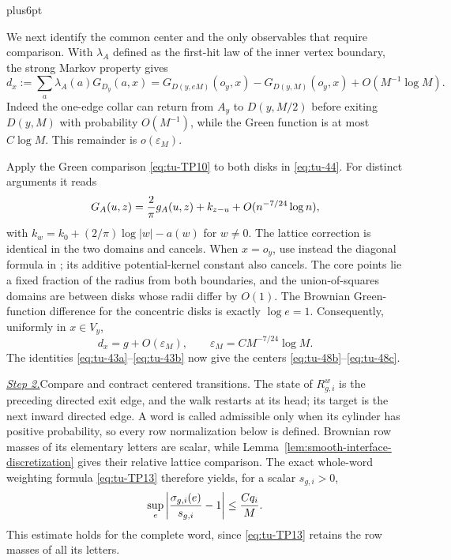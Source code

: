 \documentclass[12pt,reqno]{amsart}
\makeatletter
\theoremstyle{plain}
\theoremstyle{definition}
\theoremstyle{remark}
\renewenvironment{proof}[1][\proofname]{%
  \par
  \pushQED{\qed}%
  \normalfont
  \topsep6pt plus6pt\relax
  \trivlist
  \item[\hskip\labelsep\slshape #1\@addpunct{.}]%
  \ignorespaces
}{%
  \popQED
  \endtrivlist
  \@endpefalse
}
\DeclareRobustCommand{\qed}{%
  \leavevmode\unskip\penalty9999\hbox{}\nobreak
  \ifmmode
    \makebox[0pt][l]{\qquad\hbox{\qedsymbol}}%
  \else
    \qquad\hbox{\qedsymbol}%
  \fi
}
\renewcommand{\qedsymbol}{\rule[.47pt]{4pt}{6pt}}
\numberwithin{equation}{section}
\makeatother
\begin{document}
\begin{proof}[Proof of Lemma~\ref{lem:terminal-feynman-kac}]
We next identify the common center and the only observables that require
comparison.  With \(\lambda_A\) defined as the first-hit law of the
inner vertex boundary, the strong Markov property gives
\begin{equation}
 d_x:=\sum_a\lambda_A(a)G_{D_y}(a,x)
 =G_{D(y,eM)}(o_y,x)-G_{D(y,M)}(o_y,x)
                  +O(M^{-1}\log M).                         \label{eq:tu-44}
\end{equation}
Indeed the one-edge collar can return from \(A_y\) to \(D(y,M/2)\)
before exiting \(D(y,M)\) with probability \(O(M^{-1})\), while the
Green function is at most \(C\log M\).  This remainder is
\(o(\varepsilon_M)\).

Apply the Green comparison \eqref{eq:tu-TP10} to both disks in \eqref{eq:tu-44}. For distinct
arguments it reads
\begin{equation}
 G_A(u,z)={2\over\pi}g_A(u,z)+k_{z-u}
                  +O(n^{-7/24}\log n),\label{eq:tu-45}
\end{equation}
with \(k_w=k_0+(2/\pi)\log|w|-a(w)\) for \(w\ne0\).
The lattice correction is identical in the two domains and cancels.
When \(x=o_y\), use instead the diagonal formula in
\cite[Theorem~1.2]{KozdronLawler2005}; its additive potential-kernel
constant also cancels. The core points lie a fixed fraction of the radius
from both boundaries, and the union-of-squares domains are between disks
whose radii differ by \(O(1)\). The Brownian Green-function difference
for the concentric disks is exactly \(\log e=1\). Consequently, uniformly
in \(x\in V_y\),
\begin{equation}
                     d_x=g+O(\varepsilon_M),
 \qquad \varepsilon_M=CM^{-7/24}\log M.                    \label{eq:tu-46}
\end{equation}
The identities \eqref{eq:tu-43a}--\eqref{eq:tu-43b} now give the centers \eqref{eq:tu-48b}--\eqref{eq:tu-48c}.

\smallskip\noindent
\underline{\textit{Step 2.}}\quad Compare and contract centered transitions.
The state of
\(R_{g,i}^w\) is the preceding directed exit edge, and the walk restarts at
its head; its target is the next inward directed edge.  A word is called
admissible only when its cylinder has positive probability, so every row
normalization below is defined.  Brownian row masses of its elementary
letters are scalar, while Lemma~\ref{lem:smooth-interface-discretization} gives
their relative lattice comparison.  The exact whole-word weighting formula
\eqref{eq:tu-TP13} therefore yields, for a scalar \(s_{g,i}>0\),
\begin{equation}
 \sup_e\left|{\sigma_{g,i}(e)\over s_{g,i}}-1\right|
       \le {Cq_i\over M}.                                  \label{eq:tu-58c}
\end{equation}
This estimate holds for the complete word, since \eqref{eq:tu-TP13} retains the row
masses of all its letters.


\end{proof}
\end{document}
